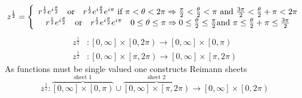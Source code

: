 \documentclass[aps,preprint]{revtex4}%
\begin{document}
\begin{equation}
z^{\frac{1}{2}}=\left\{
\begin{array}
[c]{c}%
r^{\frac{1}{2}}e^{i\frac{\theta}{2}}\text{\quad or\quad}r^{\frac{1}{2}%
}e^{i\frac{\theta}{2}}e^{i\pi}\text{ if }\pi<\theta<2\pi\Rightarrow\frac{\pi
}{2}<\frac{\theta}{2}<\pi\text{ and }\frac{3\pi}{2}<\frac{\theta}{2}+\pi
<2\pi\\
r^{\frac{1}{2}}e^{i\frac{\theta}{2}}\text{\quad or\quad}r^{\frac{1}{2}%
}e^{i\frac{\theta}{2}}e^{i\pi}\quad0\leq\theta\leq\pi\Rightarrow0\leq
\frac{\theta}{2}\leq\frac{\pi}{2}\text{and }\pi\leq\frac{\theta}{2}+\pi
\leq\frac{3\pi}{2}%
\end{array}
\right.
\end{equation}%
\begin{align}
z^{\frac{1}{2}} &  :\left[  0,\infty\right]  \times\left[  0,2\pi\right)
\longrightarrow\left[  0,\infty\right]  \times\left[  0,\pi\right)  \\
z^{\frac{1}{2}} &  :\left[  0,\infty\right]  \times\left[  \pi,2\pi\right)
\longrightarrow\left[  0,\infty\right]  \times\left[  \pi,2\pi\right)
\end{align}
As functions must be single valued one constructs Reimann sheets
\begin{equation}
z^{\frac{1}{2}}:\overset{\text{sheet 1}}{\overbrace{\left[  0,\infty\right]
\times\left[  0,\pi\right)  }}\cup\overset{\text{sheet 2}}{\overbrace{\left[
0,\infty\right]  \times\left[  \pi,2\pi\right)  }}\longrightarrow\left[
0,\infty\right]  \times\left[  0,2\pi\right)
\end{equation}
\end{document}
